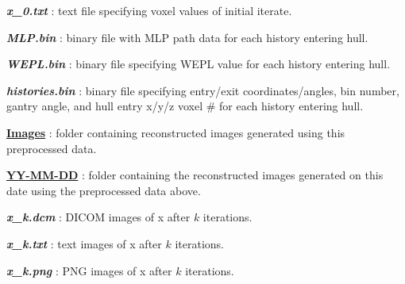 \documentclass[landscape]{article}
\begin{document}
\begin{myEnumerate}[labelindent=0pt, leftmargin=*]
\begin{myEnumerate}[labelindent=1pt, leftmargin=*]
\begin{myEnumerate}[labelindent=1pt, leftmargin=*]
\begin{myEnumerate}[labelindent=1pt, leftmargin=*]
\begin{myEnumerate}[labelindent=1pt, leftmargin=*]
\begin{myEnumerate}[labelindent=1pt, leftmargin=*]
\begin{myEnumerate}[labelindent=1pt, leftmargin=*]
\begin{myEnumerate}[labelindent=1pt, leftmargin=*]
\begin{myEnumerate}[labelindent=1pt, leftmargin=*]
                                    \item \textbf{\textit{x\_0.txt}} : text file specifying voxel values of initial iterate.
                                    \item \textbf{\textit{MLP.bin}} : binary file with MLP path data for each history entering hull.
                                    \item \textbf{\textit{WEPL.bin}} : binary file specifying WEPL value for each history entering hull.
                                    \item \textbf{\textit{histories.bin}} : binary file specifying entry/exit coordinates/angles, bin number, gantry angle, and hull entry x/y/z voxel \# for each history entering hull.
                                    \item \ul{\textbf{Images}} : folder containing reconstructed images generated using this preprocessed data.
                                    \begin{myEnumerate}[labelindent=1pt, leftmargin=*]
                                        \item \ul{\textbf{YY-MM-DD}} : folder containing the reconstructed images generated on this date using the preprocessed data above.
                                            \begin{myEnumerate}[labelindent=1pt, leftmargin=*]
                                                \item \textbf{\textit{x\_k.dcm}} : DICOM images of x after $k$ iterations.
                                                \item \textbf{\textit{x\_k.txt}} : text images of x after $k$ iterations.
                                                \item \textbf{\textit{x\_k.png}} : PNG images of x after $k$ iterations.
                                            \end{myEnumerate}
                                    \end{myEnumerate}
                                \end{myEnumerate}
                            \end{myEnumerate}
                        \end{myEnumerate}
                    \end{myEnumerate}
                \end{myEnumerate}
            \end{myEnumerate}
        \end{myEnumerate}
    \end{myEnumerate}
\end{myEnumerate}
\end{document}
